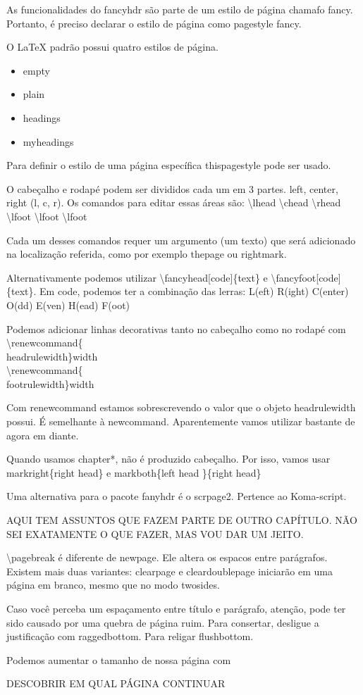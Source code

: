 As funcionalidades do fancyhdr são parte de um estilo de página chamafo fancy.
Portanto, é preciso declarar o estilo de página como pagestyle fancy.

O LaTeX padrão possui quatro estilos de página.
\begin{itemize}
    \item empty
    \item plain
    \item headings
    \item myheadings
\end{itemize}

Para definir o estilo de uma página específica thispagestyle pode ser usado.

O cabeçalho e rodapé podem ser divididos cada um em 3 partes.
left, center, right (l, c, r).
Os comandos para editar essas áreas são:
\textbackslash lhead \textbackslash chead \textbackslash rhead 
\textbackslash lfoot \textbackslash lfoot \textbackslash lfoot 

Cada um desses comandos requer um argumento (um texto) que será adicionado
na localização referida, como por exemplo thepage ou rightmark.

Alternativamente podemos utilizar \textbackslash fancyhead[code]\{text\} e
\textbackslash fancyfoot[code]\{text\}.
Em code, podemos ter a combinação das lerras:
L(eft) R(ight) C(enter) O(dd) E(ven) H(ead) F(oot)

Podemos adicionar linhas decorativas tanto no cabeçalho como no rodapé com\\
\textbackslash renewcommand\{\\headrulewidth\}{width}\\
\textbackslash renewcommand\{\\footrulewidth\}{width}

Com renewcommand estamos sobrescrevendo o valor que o objeto headrulewidth possui.
É semelhante à newcommand.
Aparentemente vamos utilizar bastante de agora em diante.

Quando usamos chapter*, não é produzido cabeçalho.
Por isso, vamos usar \\
markright\{right head\} e markboth\{left head \}\{right head\}

Uma alternativa para o pacote fanyhdr é o scrpage2.
Pertence ao Koma-script.

AQUI TEM ASSUNTOS QUE FAZEM PARTE DE OUTRO CAPÍTULO.
NÃO SEI EXATAMENTE O QUE FAZER, MAS VOU DAR UM JEITO.

\textbackslash pagebreak é diferente de newpage. Ele altera os espacos entre parágrafos.
Existem mais duas variantes: clearpage e cleardoublepage iniciarão
em uma página em branco, mesmo que no modo twosides.

Caso você perceba um espaçamento entre título e parágrafo,
atenção, pode ter sido causado por uma quebra de página ruim.
Para consertar, desligue a justificação com raggedbottom.
Para religar flushbottom.

Podemos aumentar o tamanho de nossa página com 

DESCOBRIR EM QUAL PÁGINA CONTINUAR

\newpage
